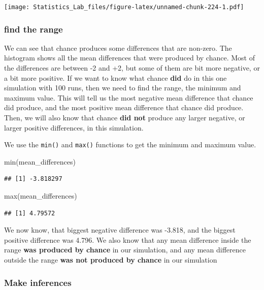 \documentclass[
]{book}
\newenvironment{Shaded}{\begin{snugshade}}{\end{snugshade}}
\newcommand{\FunctionTok}[1]{\textcolor[rgb]{0.00,0.00,0.00}{#1}}
\newcommand{\NormalTok}[1]{#1}
\begin{document}
\texttt{[image: Statistics\_Lab\_files/figure-latex/unnamed-chunk-224-1.pdf]}

\hypertarget{find-the-range}{%
\subsubsection{find the range}\label{find-the-range}}

We can see that chance produces some differences that are non-zero. The histogram shows all the mean differences that were produced by chance. Most of the differences are between -2 and +2, but some of them are bit more negative, or a bit more positive. If we want to know what chance \textbf{did} do in this one simulation with 100 runs, then we need to find the range, the minimum and maximum value. This will tell us the most negative mean difference that chance did produce, and the most positive mean difference that chance did produce. Then, we will also know that chance \textbf{did not} produce any larger negative, or larger positive differences, in this simulation.

We use the \texttt{min()} and \texttt{max()} functions to get the minimum and maximum value.

\begin{Shaded}
\begin{Highlighting}[]
\FunctionTok{min}\NormalTok{(mean\_differences)}
\end{Highlighting}
\end{Shaded}

\begin{verbatim}
## [1] -3.818297
\end{verbatim}

\begin{Shaded}
\begin{Highlighting}[]
\FunctionTok{max}\NormalTok{(mean\_differences)}
\end{Highlighting}
\end{Shaded}

\begin{verbatim}
## [1] 4.79572
\end{verbatim}

We now know, that biggest negative difference was -3.818, and the biggest positive difference was 4.796. We also know that any mean difference inside the range \textbf{was produced by chance} in our simulation, and any mean difference outside the range \textbf{was not produced by chance} in our simulation

\hypertarget{make-inferences}{%
\subsubsection{Make inferences}\label{make-inferences}}
\end{document}
